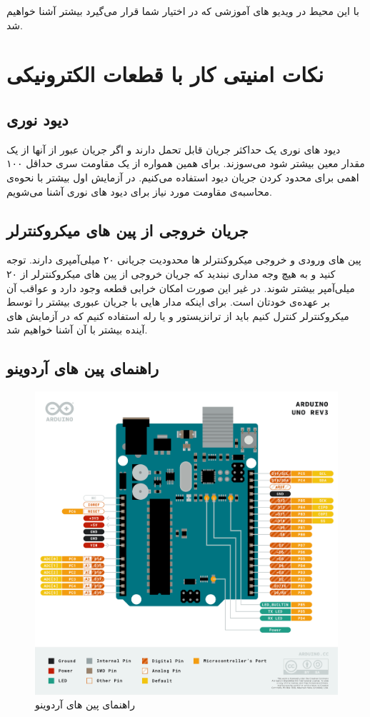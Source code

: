 با این محیط در ویدیو های آموزشی که در اختیار شما قرار می‌گیرد بیشتر آشنا خواهیم شد.

\section{نکات امنیتی کار با قطعات الکترونیکی}

\subsection{دیود نوری}
دیود های نوری یک حداکثر جریان قابل تحمل دارند و اگر جریان عبور از آنها از یک مقدار معین بیشتر شود می‌سوزند. برای همین همواره از یک مقاومت سری حداقل ۱۰۰ اهمی برای محدود کردن جریان دیود استفاده می‌کنیم. در آزمایش اول بیشتر با نحوه‌ی محاسبه‌ی مقاومت مورد نیاز برای دیود های نوری آشنا می‌شویم.

\subsection{جریان خروجی از پین های میکروکنترلر}

پین های ورودی و خروجی میکروکنترلر ها محدودیت جریانی ۲۰ میلی‌آمپری دارند. توجه کنید و به هیچ وجه مداری نبندید که جریان خروجی از پین های میکروکنترلر از ۲۰ میلی‌آمپر بیشتر شوند. در غیر این صورت امکان خرابی قطعه وجود دارد و عواقب آن بر عهده‌ی خودتان است. برای اینکه مدار هایی با جریان عبوری بیشتر را توسط میکروکنترلر کنترل کنیم باید از ترانزیستور و یا رله استفاده کنیم که در آزمایش های آینده بیشتر با آن آشنا خواهیم شد.

\subsection{راهنمای پین های آردوینو}
\begin{figure}[h]
    \centering
    \includegraphics[width=16cm]{Pinout-UNO.png}
    \caption{راهنمای پین های آردوینو}
    \label{fig:ard_pinout}
\end{figure}